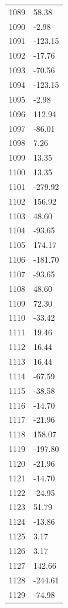 \documentclass[a4paper,11pt]{article}
\begin{document}
\begin{center}
\begin{longtable}{|R{1.5cm}|R{2.5cm}|}
 1089 &        58.38 \\
 1090 &        -2.98 \\
 1091 &      -123.15 \\
 1092 &       -17.76 \\
 1093 &       -70.56 \\
 1094 &      -123.15 \\
 1095 &        -2.98 \\
 1096 &       112.94 \\
 1097 &       -86.01 \\
 1098 &         7.26 \\
 1099 &        13.35 \\
 1100 &        13.35 \\
 1101 &      -279.92 \\
 1102 &       156.92 \\
 1103 &        48.60 \\
 1104 &       -93.65 \\
 1105 &       174.17 \\
 1106 &      -181.70 \\
 1107 &       -93.65 \\
 1108 &        48.60 \\
 1109 &        72.30 \\
 1110 &       -33.42 \\
 1111 &        19.46 \\
 1112 &        16.44 \\
 1113 &        16.44 \\
 1114 &       -67.59 \\
 1115 &       -38.58 \\
 1116 &       -14.70 \\
 1117 &       -21.96 \\
 1118 &       158.07 \\
 1119 &      -197.80 \\
 1120 &       -21.96 \\
 1121 &       -14.70 \\
 1122 &       -24.95 \\
 1123 &        51.79 \\
 1124 &       -13.86 \\
 1125 &         3.17 \\
 1126 &         3.17 \\
 1127 &       142.66 \\
 1128 &      -244.61 \\
 1129 &       -74.98 \\

\end{longtable}
\end{center}
\end{document}
